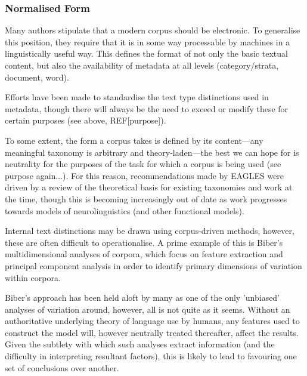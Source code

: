 \subsubsection{Normalised Form}
Many authors stipulate that a modern corpus should be electronic.  To generalise this position, they require that it is in some way processable by machines in a linguistically useful way.  This defines the format of not only the basic textual content, but also the availability of metadata at all levels (category/strata, document, word).

Efforts have been made %
%
%
to standardise the text type distinctions used in metadata, though there will always be the need to exceed or modify these for certain purposes (see above, REF[purpose]).

To some extent, the form a corpus takes is defined by its content---any meaningful taxonomy is arbitrary and theory-laden---the best we can hope for is neutrality for the purposes of the task for which a corpus is being used (see purpose again...).  For this reason, recommendations made by EAGLES were driven by a review of the theoretical basis for existing taxonomies and work at the time, though this is becoming increasingly out of date as work progresses towards models of neurolinguistics (and other functional models).


Internal text distinctions may be drawn using corpus-driven methods, however, these are often difficult to operationalise.  A prime example of this is Biber's multidimensional analyses of corpora, which focus on feature extraction and principal component analysis in order to identify primary dimensions of variation within corpora.

Biber's approach has been held aloft by many as one of the only 'unbiased' analyses of variation around, however, all is not quite as it seems.  Without an authoritative underlying theory of language use by humans, any features used to construct the model will, however neutrally treated thereafter, affect the results.  Given the subtlety with which such analyses extract information (and the difficulty in interpreting resultant factors), this is likely to lead to favouring one set of conclusions over another.

